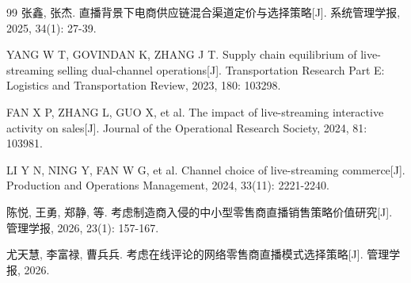 \documentclass[12pt,a4paper]{article}
\begin{document}
\begin{thebibliography}{99}
张鑫, 张杰. 直播背景下电商供应链混合渠道定价与选择策略[J]. 系统管理学报, 2025, 34(1): 27-39.

YANG W T, GOVINDAN K, ZHANG J T. Supply chain equilibrium of live-streaming selling dual-channel operations[J]. Transportation Research Part E: Logistics and Transportation Review, 2023, 180: 103298.

FAN X P, ZHANG L, GUO X, et al. The impact of live-streaming interactive activity on sales[J]. Journal of the Operational Research Society, 2024, 81: 103981.

LI Y N, NING Y, FAN W G, et al. Channel choice of live-streaming commerce[J]. Production and Operations Management, 2024, 33(11): 2221-2240.

陈悦, 王勇, 郑静, 等. 考虑制造商入侵的中小型零售商直播销售策略价值研究[J]. 管理学报, 2026, 23(1): 157-167.

尤天慧, 李富禄, 曹兵兵. 考虑在线评论的网络零售商直播模式选择策略[J]. 管理学报, 2026.

\end{thebibliography}
\end{document}
